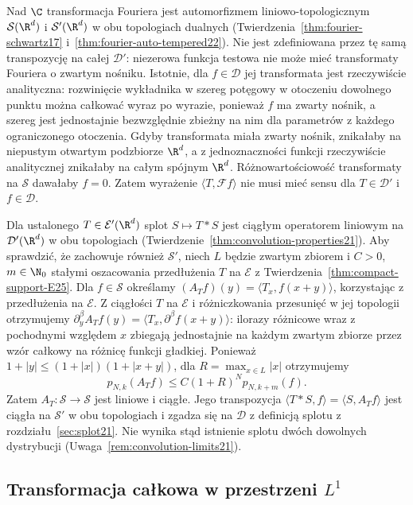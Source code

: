 \begin{uwaga}
\label{rem:fourier-conv25}
Nad $\C$ transformacja Fouriera jest automorfizmem
liniowo-topologicznym $\mathcal S(\R^d)$ i
$\mathcal S'(\R^d)$ w obu topologiach dualnych
(Twierdzenia~\ref{thm:fourier-schwartz17}
i~\ref{thm:fourier-auto-tempered22}).
Nie jest zdefiniowana przez tę samą transpozycję
na całej $\mathcal D'$: niezerowa funkcja testowa
nie może mieć transformaty Fouriera o zwartym nośniku.
Istotnie, dla $f\in\mathcal D$ jej transformata
jest rzeczywiście analityczna: rozwinięcie wykładnika
w szereg potęgowy w otoczeniu dowolnego punktu
można całkować wyraz po wyrazie, ponieważ $f$ ma
zwarty nośnik, a szereg jest jednostajnie bezwzględnie
zbieżny na nim dla parametrów z każdego ograniczonego
otoczenia. Gdyby transformata miała zwarty nośnik,
znikałaby na niepustym otwartym podzbiorze $\R^d$,
a z jednoznaczności funkcji rzeczywiście analitycznej
znikałaby na całym spójnym $\R^d$.
Różnowartościowość transformaty na $\mathcal S$
dawałaby $f=0$. Zatem wyrażenie
$\langle T,\mathcal F f\rangle$ nie musi mieć sensu
dla $T\in\mathcal D'$ i $f\in\mathcal D$.

Dla ustalonego $T\in\mathcal E'(\R^d)$ splot
$S\mapsto T*S$ jest ciągłym operatorem liniowym
na $\mathcal D'(\R^d)$ w obu topologiach
(Twierdzenie~\ref{thm:convolution-properties21}).
Aby sprawdzić, że zachowuje również $\mathcal S'$,
niech $L$ będzie zwartym zbiorem i $C>0$, $m\in\N_0$
stałymi oszacowania przedłużenia $T$ na $\mathcal E$
z Twierdzenia~\ref{thm:compact-support-E25}.
Dla $f\in\mathcal S$ określamy
$(A_Tf)(y)=\langle T_x,f(x+y)\rangle$,
korzystając z przedłużenia na $\mathcal E$.
Z ciągłości $T$ na $\mathcal E$ i różniczkowania
przesunięć w jej topologii otrzymujemy
$\partial_y^\beta A_T f(y)=
\langle T_x,\partial^\beta f(x+y)\rangle$:
ilorazy różnicowe wraz z pochodnymi względem $x$
zbiegają jednostajnie na każdym zwartym zbiorze
przez wzór całkowy na różnicę funkcji gładkiej.
Ponieważ $1+|y|\le(1+|x|)(1+|x+y|)$, dla
$R=\max_{x\in L}|x|$ otrzymujemy
\[
 p_{N,k}(A_Tf)\le C(1+R)^N p_{N,k+m}(f).
\]
Zatem $A_T:\mathcal S\to\mathcal S$ jest liniowe
i ciągłe. Jego transpozycja
$\langle T*S,f\rangle=\langle S,A_Tf\rangle$
jest ciągła na $\mathcal S'$ w obu topologiach
i zgadza się na $\mathcal D$ z definicją splotu
z rozdziału~\ref{sec:splot21}.
Nie wynika stąd istnienie splotu dwóch dowolnych
dystrybucji (Uwaga~\ref{rem:convolution-limits21}).
\end{uwaga}

\subsection{Transformacja całkowa w przestrzeni \texorpdfstring{$L^1$}{L1}}

